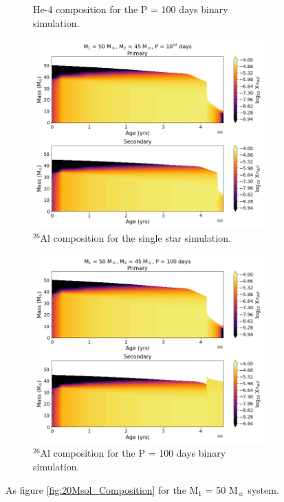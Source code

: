 \begin{figure}
\begin{subfigure}{\columnwidth}
        \caption{He-4 composition for the P = 100 days binary simulation.}
        \label{subfig:50Msol_He4_Bin}
    \end{subfigure}
    \begin{subfigure}{\columnwidth}
        \includegraphics[width=\textwidth]{figures/results1/fig_Al26_Age_M50_Sin.png}
        \captionsetup{width=.9\columnwidth}
        \caption{$^{26}$Al composition for the single star simulation.}
        \label{subfig:50Msol_Al26_Sin}
    \end{subfigure}
    \begin{subfigure}{\columnwidth}
        \includegraphics[width=\textwidth]{figures/results1/fig_Al26_Age_M50_P100.png}
        \captionsetup{width=.9\columnwidth}
        \caption{$^{26}$Al composition for the P = 100 days binary simulation.}
        \label{subfig:50Msol_Al26_Bin}
    \end{subfigure}
\caption{As figure \ref{fig:20Msol_Composition} for the M$_1$ = 50 M$_{\sun}$ system.}
\label{fig:50Msol_Composition}
\end{figure}

